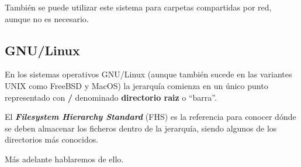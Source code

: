 También se puede utilizar este sistema para carpetas compartidas por red, aunque no es necesario.

\subsection{GNU/Linux}
En los sistemas operativos GNU/Linux (aunque también sucede en las variantes UNIX como FreeBSD y MacOS) la jerarquía comienza en un único punto representado con \textbf{/} denominado \textbf{directorio raiz} o “barra”.

El \textbf{\textit{Filesystem Hierarchy Standard}} (FHS) es la referencia para conocer dónde se deben almacenar los ficheros dentro de la jerarquía, siendo algunos de los directorios más conocidos.

Más adelante hablaremos de ello.